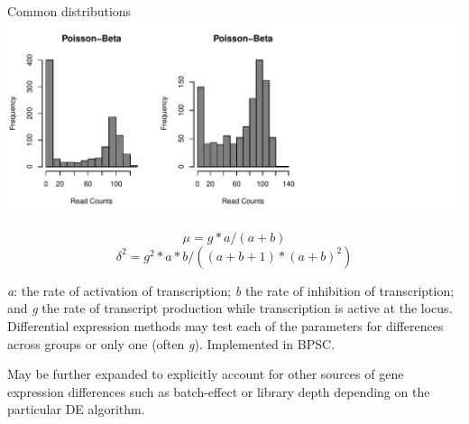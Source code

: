 \documentclass{beamer}\usepackage[]{graphicx}\usepackage[]{color}
\makeatletter
\def\maxwidth{ %
  \ifdim\Gin@nat@width>\linewidth
    \linewidth
  \else
    \Gin@nat@width
  \fi
}
\newenvironment{knitrout}{}{} %
\makeatother
\begin{document}
\begin{frame}
\begin{block}{Common distributions} %
\begin{knitrout}
\color{fgcolor}
\includegraphics[width=\maxwidth]{figure/dist-poisson-beta-1} 

\end{knitrout}

\tiny
$$\mu=g*a/(a+b)$$
$$\delta^2=g^2*a*b/((a+b+1)*(a+b)^2)$$

\textit{a}: the rate of activation of transcription; \textit{b} the rate of inhibition of transcription; and \textit{g} the rate of transcript production while transcription is active at the locus. Differential expression methods may test each of the parameters for differences across groups or only one (often \textit{g}). Implemented in BPSC.

May be further expanded to explicitly account for other sources of gene expression differences such as batch-effect or library depth depending on the particular DE algorithm. 
\end{block}
\end{frame}
\end{document}
